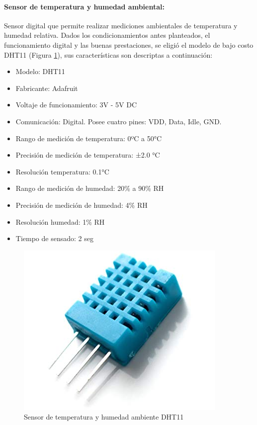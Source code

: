             \paragraph{Sensor de temperatura y humedad ambiental:}Sensor digital que permite realizar mediciones ambientales de temperatura y humedad relativa. Dados los condicionamientos antes planteados, el funcionamiento digital y las buenas prestaciones, se eligió el modelo de bajo costo DHT11 (Figura \ref{SensorDHT11}), sus características son descriptas a continuación:
                \begin{itemize}
                    \item Modelo: DHT11
                    \item Fabricante: Adafruit
                    \item Voltaje de funcionamiento: 3V - 5V DC
                    \item Comunicación: Digital. Posee cuatro pines: VDD, Data, Idle, GND.
                    \item Rango de medición de temperatura: 0ºC a 50°C
                    \item Precisión de medición de temperatura: ±2.0 °C
                    \item Resolución temperatura: 0.1°C
                    \item Rango de medición de humedad: 20\% a 90\% RH
                    \item Precisión de medición de humedad: 4\% RH
                    \item Resolución humedad: 1\% RH
                    \item Tiempo de sensado: 2 seg
                \end{itemize}
                
                \begin{figure} [h]
                    \centering
                    \includegraphics[scale=0.35]{hardware/dht11_.jpg}
                    \caption{Sensor de temperatura y humedad ambiente DHT11}
                    \label{SensorDHT11}
                \end{figure}

